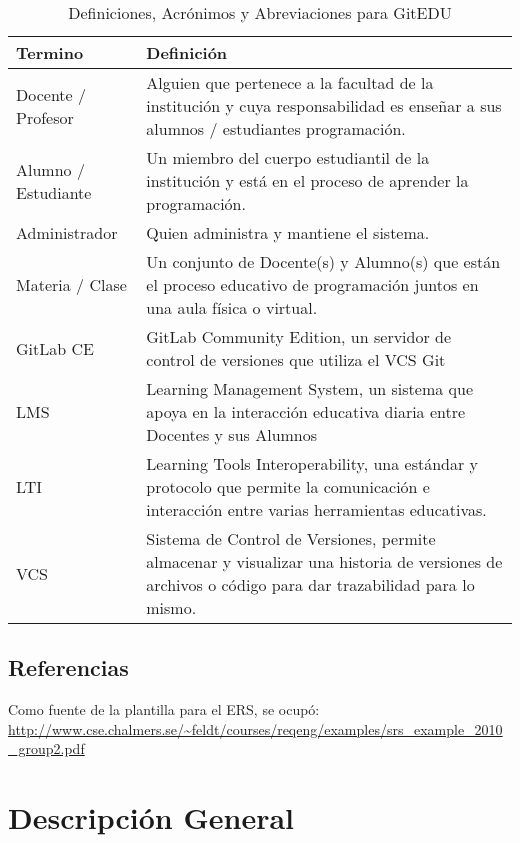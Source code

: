 \begin{table}[h!]
	\begin{tabular}{|p{}|p{}|}
    	\hline
    	\textbf{Termino} & \textbf{Definición} \\
        \hline
		Docente / Profesor & Alguien que pertenece a la facultad de la institución y cuya responsabilidad es enseñar a sus alumnos / estudiantes programación. \\
		\hline
		Alumno / Estudiante & Un miembro del cuerpo estudiantil de la institución y está en el proceso de aprender la programación. \\
		\hline
		Administrador & Quien administra y mantiene el sistema. \\
		\hline
		Materia / Clase & Un conjunto de Docente(s) y Alumno(s) que están el proceso educativo de programación juntos en una aula física o virtual. \\
		\hline
		GitLab CE & GitLab Community Edition, un servidor de control de versiones que utiliza el VCS Git \\
		\hline
		LMS & Learning Management System, un sistema que apoya en la interacción educativa diaria entre Docentes y sus Alumnos \\
		\hline
		LTI & Learning Tools Interoperability, una estándar y protocolo que permite la comunicación e interacción entre varias herramientas educativas. \\
		\hline
		VCS & Sistema de Control de Versiones, permite almacenar y visualizar una historia de versiones de archivos o código para dar trazabilidad para lo mismo.  \\
		\hline
	\end{tabular}
    \caption{Definiciones, Acrónimos y Abreviaciones para GitEDU}
    \label{definiciones_ers}
\end{table}


\subsection{Referencias}
Como fuente de la plantilla para el ERS, se ocupó:
\url{http://www.cse.chalmers.se/~feldt/courses/reqeng/examples/srs_example_2010_group2.pdf}

\section{Descripción General}
